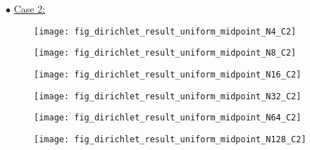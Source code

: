 \documentclass{article}
\begin{document}
	\noindent$\bullet$ \underline{Case 2:}
	\begin{figure}[H]
		\centering	\texttt{[image: fig\_dirichlet\_result\_uniform\_midpoint\_N4\_C2]}
	\end{figure}
	\begin{figure}[H]
		\centering	\texttt{[image: fig\_dirichlet\_result\_uniform\_midpoint\_N8\_C2]}
	\end{figure}
	\begin{figure}[H]
		\centering	\texttt{[image: fig\_dirichlet\_result\_uniform\_midpoint\_N16\_C2]}
	\end{figure}
	\begin{figure}[H]
		\centering	\texttt{[image: fig\_dirichlet\_result\_uniform\_midpoint\_N32\_C2]}
	\end{figure}
	\begin{figure}[H]
		\centering	\texttt{[image: fig\_dirichlet\_result\_uniform\_midpoint\_N64\_C2]}
	\end{figure}
	\begin{figure}[H]
		\centering	\texttt{[image: fig\_dirichlet\_result\_uniform\_midpoint\_N128\_C2]}
	\end{figure}
\end{document}
